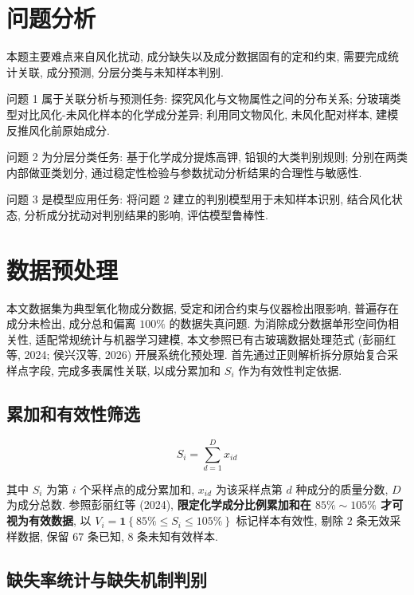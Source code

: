 \documentclass{ctexart}
\begin{document}
\section{问题分析}

本题主要难点来自风化扰动, 成分缺失以及成分数据固有的定和约束, 需要完成统计关联, 成分预测, 分层分类与未知样本判别.

问题 1 属于关联分析与预测任务: 探究风化与文物属性之间的分布关系; 分玻璃类型对比风化-未风化样本的化学成分差异; 利用同文物风化, 未风化配对样本, 建模反推风化前原始成分.

问题 2 为分层分类任务: 基于化学成分提炼高钾, 铅钡的大类判别规则; 分别在两类内部做亚类划分, 通过稳定性检验与参数扰动分析结果的合理性与敏感性.

问题 3 是模型应用任务: 将问题 2 建立的判别模型用于未知样本识别, 结合风化状态, 分析成分扰动对判别结果的影响, 评估模型鲁棒性.

\section{数据预处理}

本文数据集为典型氧化物成分数据, 受定和闭合约束与仪器检出限影响, 普遍存在成分未检出, 成分总和偏离 $100\%$ 的数据失真问题. 为消除成分数据单形空间伪相关性, 适配常规统计与机器学习建模, 本文参照已有古玻璃数据处理范式 (彭丽红等, 2024; 侯兴汉等, 2026) \cite{penglihong2024,houxinghan2026}开展系统化预处理. 首先通过正则解析拆分原始复合采样点字段, 完成多表属性关联, 以成分累加和 $S_i$ 作为有效性判定依据.

\subsection{累加和有效性筛选}

\begin{equation*}
S_{i}=\sum_{d=1}^{D}x_{id}
\end{equation*}

其中 $S_i$ 为第 $i$ 个采样点的成分累加和, $x_{id}$ 为该采样点第 $d$ 种成分的质量分数, $D$ 为成分总数. 参照彭丽红等 (2024), \textbf{限定化学成分比例累加和在 $85\%\sim105\%$ 才可视为有效数据}, 以 $V_{i}=\mathbf{1}\left\{85\%\le{}S_{i}\le105\%\right\}$ 标记样本有效性, 剔除 $2$ 条无效采样数据, 保留 $67$ 条已知, $8$ 条未知有效样本.

\subsection{缺失率统计与缺失机制判别}
\end{document}
